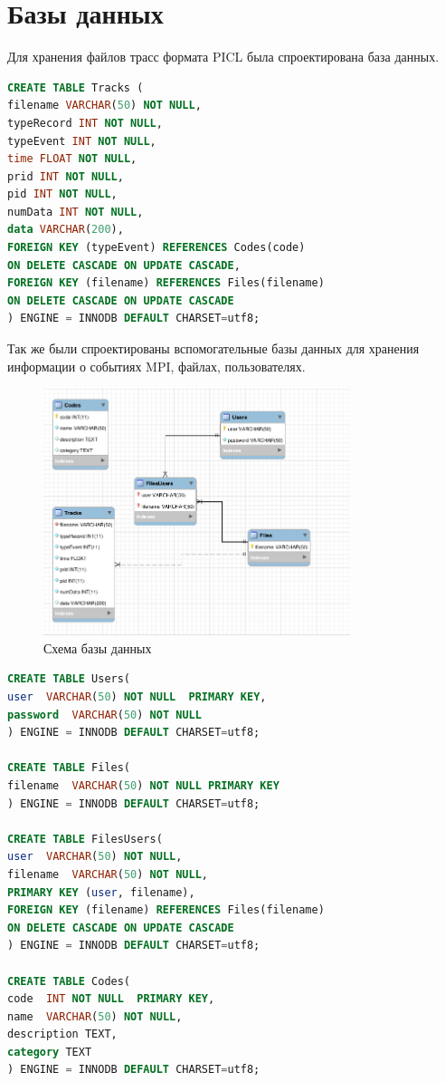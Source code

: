 \section{Базы данных}
Для хранения файлов трасс формата PICL была спроектирована база данных.
\begin{lstlisting}[language=SQL]
CREATE TABLE Tracks ( 
filename VARCHAR(50) NOT NULL,
typeRecord INT NOT NULL,
typeEvent INT NOT NULL,
time FLOAT NOT NULL,
prid INT NOT NULL,
pid INT NOT NULL,
numData INT NOT NULL,
data VARCHAR(200),
FOREIGN KEY (typeEvent) REFERENCES Codes(code) 
ON DELETE CASCADE ON UPDATE CASCADE,
FOREIGN KEY (filename) REFERENCES Files(filename) 
ON DELETE CASCADE ON UPDATE CASCADE
) ENGINE = INNODB DEFAULT CHARSET=utf8;
\end{lstlisting}
Так же были спроектированы вспомогательные базы данных для хранения информации о событиях MPI, файлах, пользователях.
\begin{figure}[h!]
	\centering
	\includegraphics[width=0.8\textwidth]{img/img7.png}
	\caption{Схема базы данных}
	\label{fig:spire12}
\end{figure}

\begin{lstlisting}[language=SQL]
CREATE TABLE Users(
user  VARCHAR(50) NOT NULL  PRIMARY KEY,
password  VARCHAR(50) NOT NULL
) ENGINE = INNODB DEFAULT CHARSET=utf8;

CREATE TABLE Files(
filename  VARCHAR(50) NOT NULL PRIMARY KEY
) ENGINE = INNODB DEFAULT CHARSET=utf8;

CREATE TABLE FilesUsers(
user  VARCHAR(50) NOT NULL,
filename  VARCHAR(50) NOT NULL,
PRIMARY KEY (user, filename), 
FOREIGN KEY (filename) REFERENCES Files(filename)
ON DELETE CASCADE ON UPDATE CASCADE 
) ENGINE = INNODB DEFAULT CHARSET=utf8;

CREATE TABLE Codes(
code  INT NOT NULL  PRIMARY KEY,
name  VARCHAR(50) NOT NULL,
description TEXT,
category TEXT
) ENGINE = INNODB DEFAULT CHARSET=utf8;

\end{lstlisting} 

